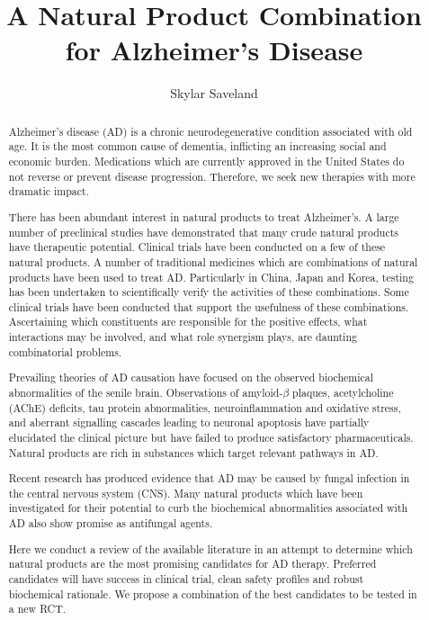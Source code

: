 \documentclass[twocolumn]{article}
\begin{document}
\onecolumn
\title{A Natural Product Combination for Alzheimer's Disease}
\author{Skylar Saveland}

\maketitle

\begin{abstract}


Alzheimer's disease (AD) is a chronic neurodegenerative condition
associated with old age. It is the most common cause of dementia,
inflicting an increasing social and economic burden.
Medications which are currently approved in the United States
do not reverse or prevent disease progression.
Therefore, we seek new therapies with more dramatic impact.

There has been abundant interest in natural products to treat Alzheimer's.
A large number of preclinical studies have demonstrated
that many crude natural products have therapeutic potential.
Clinical trials have been conducted on a few of these natural products.
A number of traditional medicines which are combinations of natural products
have been used to treat AD.
Particularly in China, Japan and Korea,
testing has been undertaken to scientifically verify the
activities of these combinations.
Some clinical trials
have been conducted that support the usefulness of these combinations.
Ascertaining which constituents are responsible for the positive effects,
what interactions may be involved,
and what role synergism plays, are daunting combinatorial problems.

Prevailing theories of AD causation have focused on the observed
biochemical abnormalities of the senile brain.
Observations of amyloid-$\beta$ plaques, acetylcholine (AChE) deficits,
tau protein abnormalities,
neuroinflammation and oxidative stress,
and aberrant signalling cascades leading to neuronal apoptosis
have partially elucidated the clinical picture
but have failed to produce satisfactory pharmaceuticals.
Natural products are rich in substances which target
relevant pathways in AD.

Recent research has produced evidence
that AD may be caused by fungal infection in the central nervous system (CNS).
Many natural products which have been investigated for their potential
to curb the biochemical abnormalities associated with AD
also show promise as antifungal agents.

Here we conduct a review of the available literature in an attempt
to determine which natural products are the most promising
candidates for AD therapy.
Preferred candidates will have
success in clinical trial,
clean safety profiles
and robust biochemical rationale.
We propose a combination of the best candidates to be tested in a new RCT.
\end{abstract}
\tableofcontents
\twocolumn
\end{document}
